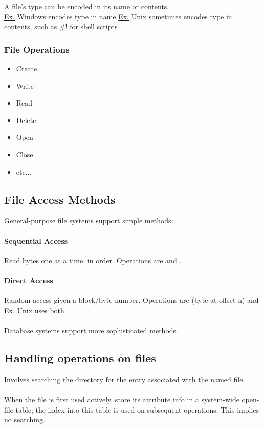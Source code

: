 \documentclass{article}
\begin{document}
A file's type can be encoded in its name or contents.\\
\underline{Ex.} Windows encodes type in name
\underline{Ex.} Unix sometimes encodes type in contents, such as \#! for shell scripts

\subsubsection{File Operations}
\begin{itemize}
    \item Create
    \item Write
    \item Read
    \item Delete
    \item Open
    \item Close
    \item etc...
\end{itemize}

\subsection{File Access Methods}

General-purpose file systems support simple methods:

\paragraph{Sequential Access} Read bytes one at a time, in order. Operations are  and .

\paragraph{Direct Access} Random access given a block/byte number. Operations are  (byte at offset n) and \\

\underline{Ex.} Unix uses both\\
\\
Database systems support more sophisticated methods.

\subsection{Handling operations on files}

Involves searching the directory for the entry associated with the named file.\\
\\
When the file is first used actively, store its attribute info in a system-wide open-file table; the index into this table is used on subsequent operations. This implies no searching.
\end{document}
